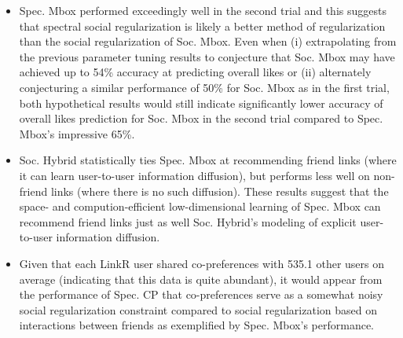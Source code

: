 \begin{itemize}
\item Spec. Mbox performed exceedingly well in the second trial 
and this suggests that spectral social regularization is likely a
better method of regularization than the social
regularization of Soc. Mbox.  Even when
(i) extrapolating from the previous parameter tuning results to
conjecture that Soc. Mbox may have achieved up to 54\% accuracy at
predicting overall likes or (ii) alternately conjecturing a similar
performance of 50\% for Soc. Mbox as in the first trial, both
hypothetical results would still indicate significantly lower accuracy
of overall likes prediction for Soc. Mbox in the second trial compared to
Spec. Mbox's impressive 65\%.

\item Soc. Hybrid statistically ties Spec. Mbox at 
recommending friend links (where it can learn user-to-user information
diffusion), but performs less well on non-friend links (where there is
no such diffusion).
%
These results suggest that the space- and
compution-efficient low-dimensional learning of Spec. Mbox can
recommend friend links just as well Soc. Hybrid's modeling of explicit
user-to-user information diffusion.

\item Given that
each LinkR user shared co-preferences with 535.1 other users on
average (indicating that this data is quite abundant), it would
appear from the performance of Spec. CP that
co-preferences serve as a somewhat noisy social regularization
constraint compared to social regularization based on interactions between
friends as exemplified by Spec. Mbox's performance.

\end{itemize}


